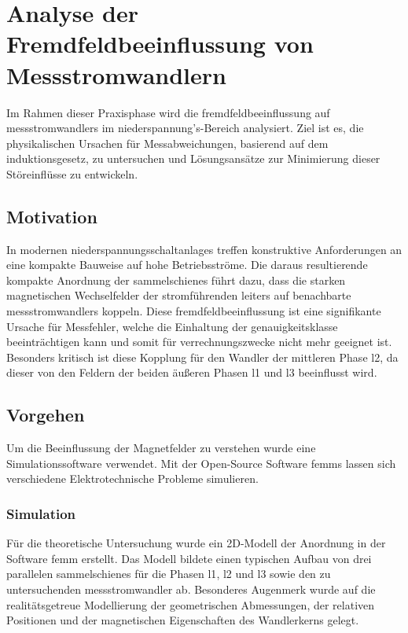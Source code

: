 
\section{Analyse der Fremdfeldbeeinflussung von Messstromwandlern}
\label{chap:projektbericht}

Im Rahmen dieser Praxisphase wird die \gls{fremdfeld}beeinflussung auf \glspl{messstromwandler} im \gls{niederspannung}'s-Bereich analysiert. Ziel ist es, die physikalischen Ursachen für Messabweichungen, basierend auf dem \gls{induktionsgesetz}, zu untersuchen und Lösungsansätze zur Minimierung dieser Störeinflüsse zu entwickeln.

\subsection{Motivation}
\label{sec:motivation}

In modernen \Glspl{niederspannungsschaltanlage} treffen konstruktive Anforderungen an eine kompakte Bauweise auf hohe Betriebsströme. Die daraus resultierende kompakte Anordnung der \glspl{sammelschiene} führt dazu, dass die starken magnetischen Wechselfelder der stromführenden \glspl{leiter} auf benachbarte \glspl{messstromwandler} koppeln. Diese \gls{fremdfeld}beeinflussung ist eine signifikante Ursache für Messfehler, welche die Einhaltung der \gls{genauigkeitsklasse} beeinträchtigen kann und somit für verrechnungszwecke nicht mehr geeignet ist. Besonders kritisch ist diese Kopplung für den Wandler der mittleren Phase \acrshort{l2}, da dieser von den Feldern der beiden äußeren Phasen \acrshort{l1} und \acrshort{l3} beeinflusst wird.


\subsection{Vorgehen}
\label{sec:vorgehen}

Um die Beeinflussung der Magnetfelder zu verstehen wurde eine Simulationssoftware verwendet. Mit der Open-Source Software \glspl{femm} lassen sich verschiedene Elektrotechnische Probleme simulieren.

\subsubsection{Simulation}
\label{sec:vorgehen:simulation}
Für die theoretische Untersuchung wurde ein 2D-Modell der Anordnung in der Software \gls{femm} erstellt. Das Modell bildete einen typischen Aufbau von drei parallelen \glspl{sammelschiene} für die Phasen \acrshort{l1}, \acrshort{l2} und \acrshort{l3} sowie den zu untersuchenden \gls{messstromwandler} ab. Besonderes Augenmerk wurde auf die realitätsgetreue Modellierung der geometrischen Abmessungen, der relativen Positionen und der magnetischen Eigenschaften des Wandlerkerns gelegt.


